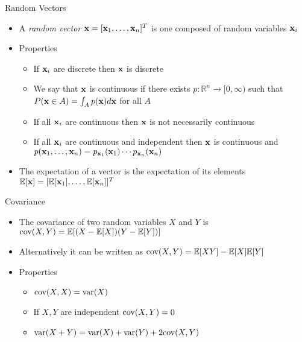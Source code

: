 \documentclass{beamer}
\begin{document}
\begin{frame}{Random Vectors}
\begin{itemize} 
 \item A \emph{random vector} $\textbf{x} = [\textbf{x}_1, \ldots, \textbf{x}_n]^T$ is one composed of random variables $\textbf{x}_i$ 
 \item Properties 
 \begin{itemize}
 \item If $\textbf{x}_i$ are discrete then $\textbf{x}$ is discrete 
 \item We say that $\textbf{x}$ is continuous if there exists $p: \mathbb{R}^n \rightarrow [0, \infty)$ such that $P(\textbf{x} \in A) = \int_A p(\textbf{x}) d \textbf{x} $ for all $A$
 \item If all $\textbf{x}_i$ are continuous then $\textbf{x}$ is not necessarily continuous
 \item If all $\textbf{x}_i$ are continuous and independent then $\textbf{x}$ is continuous and $p(\textbf{x}_1, \ldots, \textbf{x}_n) = p_{\textbf{x}_1}(\textbf{x}_1) \cdots p_{\textbf{x}_n}(\textbf{x}_n)$ 
 \end{itemize} 
 \item The expectation of a vector is the expectation of its elements  $\mathbb{E}[\textbf{x}] = [\mathbb{E}[\textbf{x}_1], \ldots, \mathbb{E}[\textbf{x}_n]]^T$ 
\end{itemize} 
\end{frame}

\begin{frame}{Covariance}  
\begin{itemize}
 \item The covariance of two random variables $X$ and $Y$ is $\mbox{cov}(X, Y) = \mathbb{E}[(X - \mathbb{E}[X])(Y - \mathbb{E}[Y])]$ 
 \item Alternatively it can be written as $\mbox{cov}(X, Y) = \mathbb{E}[XY] - \mathbb{E}[X]\mathbb{E}[Y]$
 \item Properties 
 \begin{itemize}
 \item $\mbox{cov}(X, X) = \mbox{var}(X)$ 
 \item If $X, Y$ are independent $\mbox{cov}(X, Y) = 0$ 
 \item $\mbox{var}(X + Y) = \mbox{var}(X) + \mbox{var}(Y) + 2\mbox{cov}(X, Y)$ 
 \end{itemize} 
\end{itemize}
\end{frame}
\end{document}
